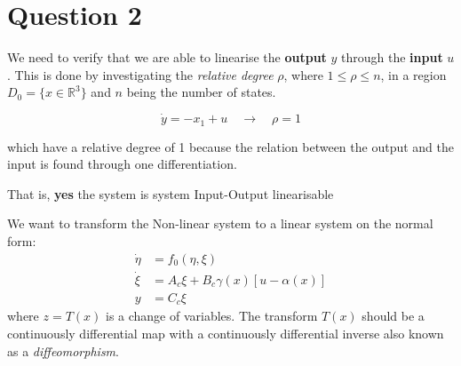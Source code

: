 \chapter{Question 2}

We need to verify that we are able to linearise the \textbf{output} $y$ through the \textbf{input} $u$. This is done by
investigating the \textit{relative degree} $\rho$, where $1 \leq \rho \leq n$, in a region $D_0 = \{x \in \mathbb{R}^3\}$ and $n$ being
the number of states. 

\begin{equation}
        \dot{y} = -x_1 + u \quad \rightarrow \quad \rho = 1
\end{equation}

which have a relative degree of 1 because the relation between the output and the input is found through one
differentiation.

That is, \textbf{yes} the system is system Input-Output linearisable

We want to transform the Non-linear system to a linear system on the normal form:
\begin{equation}
        \begin{split}
                \dot{\eta} &= f_0(\eta,\xi) \\
                \dot{\xi} &= A_c \xi + B_c \gamma(x) \left[u - \alpha(x)\right] \\
                y &= C_c \xi
        \end{split}
\end{equation}
where $z = T(x)$ is a change of variables. The transform $T(x)$ should be a continuously differential map with a
continuously differential inverse also known as a \textit{diffeomorphism}. 

